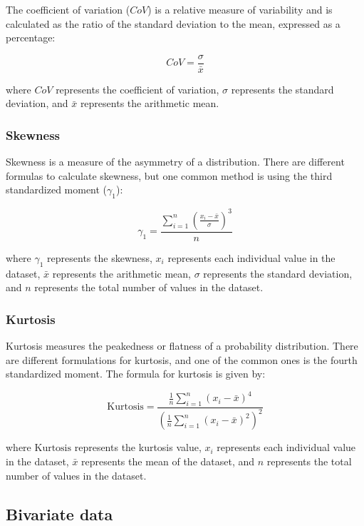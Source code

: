\documentclass[
  12pt,
  oneside]{book}
\theoremstyle{definition}
\theoremstyle{definition}
\theoremstyle{definition}
\theoremstyle{definition}
\theoremstyle{remark}
\begin{document}
The coefficient of variation (\(CoV\)) is a relative measure of variability and is calculated as the ratio of the standard deviation to the mean, expressed as a percentage:

\[
CoV =  \frac{\sigma}{\bar{x}}
\]

where \(CoV\) represents the coefficient of variation, \(\sigma\) represents the standard deviation, and \(\bar{x}\) represents the arithmetic mean.

\hypertarget{skewness}{%
\subsubsection{Skewness}\label{skewness}}

Skewness is a measure of the asymmetry of a distribution. There are different formulas to calculate skewness, but one common method is using the third standardized moment (\(\gamma_1\)):

\[
\gamma_1 = \frac{{\sum_{i=1}^{n} \left(\frac{x_i - \bar{x}}{\sigma}\right)^3}}{n}
\]

where \(\gamma_1\) represents the skewness, \(x_i\) represents each individual value in the dataset, \(\bar{x}\) represents the arithmetic mean, \(\sigma\) represents the standard deviation, and \(n\) represents the total number of values in the dataset.

\hypertarget{kurtosis}{%
\subsubsection{Kurtosis}\label{kurtosis}}

Kurtosis measures the peakedness or flatness of a probability distribution. There are different formulations for kurtosis, and one of the common ones is the fourth standardized moment. The formula for kurtosis is given by:

\[
\text{{Kurtosis}} = \frac{{\frac{1}{n} \sum_{i=1}^{n}(x_i - \bar{x})^4}}{{\left(\frac{1}{n} \sum_{i=1}^{n}(x_i - \bar{x})^2\right)^2}}
\]

where \(\text{Kurtosis}\) represents the kurtosis value, \(x_i\) represents each individual value in the dataset, \(\bar{x}\) represents the mean of the dataset, and \(n\) represents the total number of values in the dataset.

\hypertarget{bivariate-data}{%
\subsection{Bivariate data}\label{bivariate-data}}
\end{document}
